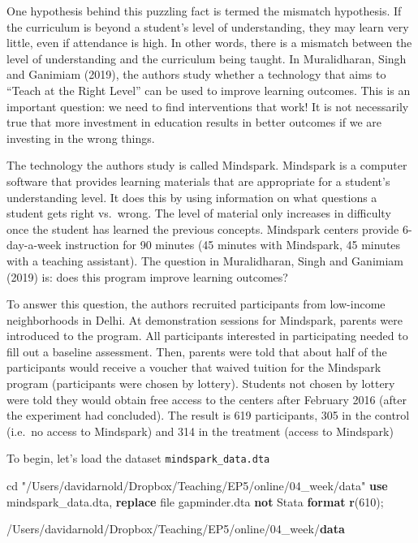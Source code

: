 \documentclass[
]{book}
\newenvironment{Shaded}{\begin{snugshade}}{\end{snugshade}}
\newcommand{\FunctionTok}[1]{\textcolor[rgb]{0.13,0.29,0.53}{\textbf{#1}}}
\newcommand{\KeywordTok}[1]{\textcolor[rgb]{0.13,0.29,0.53}{\textbf{#1}}}
\newcommand{\NormalTok}[1]{#1}
\newcommand{\StringTok}[1]{\textcolor[rgb]{0.31,0.60,0.02}{#1}}
\begin{document}
One hypothesis behind this puzzling fact is termed the mismatch hypothesis. If the curriculum is beyond a student's level of understanding, they may learn very little, even if attendance is high. In other words, there is a mismatch between the level of understanding and the curriculum being taught. In Muralidharan, Singh and Ganimiam (2019)\citep{msg2019disrupting}, the authors study whether a technology that aims to ``Teach at the Right Level'' can be used to improve learning outcomes. This is an important question: we need to find interventions that work! It is not necessarily true that more investment in education results in better outcomes if we are investing in the wrong things.

The technology the authors study is called Mindspark. Mindspark is a computer software that provides learning materials that are appropriate for a student's understanding level. It does this by using information on what questions a student gets right vs.~wrong. The level of material only increases in difficulty once the student has learned the previous concepts. Mindspark centers provide 6-day-a-week instruction for 90 minutes (45 minutes with Mindspark, 45 minutes with a teaching assistant). The question in Muralidharan, Singh and Ganimiam (2019) is: does this program improve learning outcomes?

To answer this question, the authors recruited participants from low-income neighborhoods in Delhi. At demonstration sessions for Mindspark, parents were introduced to the program. All participants interested in participating needed to fill out a baseline assessment. Then, parents were told that about half of the participants would receive a voucher that waived tuition for the Mindspark program (participants were chosen by lottery). Students not chosen by lottery were told they would obtain free access to the centers after February 2016 (after the experiment had concluded). The result is 619 participants, 305 in the control (i.e.~no access to Mindspark) and 314 in the treatment (access to Mindspark)

To begin, let's load the dataset \texttt{mindspark\_data.dta}

\begin{Shaded}
\begin{Highlighting}[]
\NormalTok{cd }\StringTok{"/Users/davidarnold/Dropbox/Teaching/EP5/online/04\_week/data"}
\KeywordTok{use}\NormalTok{ mindspark\_data.dta, }\KeywordTok{replace}
\NormalTok{file gapminder.dta }\KeywordTok{not}\NormalTok{ Stata }\KeywordTok{format}
\FunctionTok{r}\NormalTok{(610);}


\NormalTok{/Users/davidarnold/Dropbox/Teaching/EP5/online/04\_week/}\KeywordTok{data}
\end{Highlighting}
\end{Shaded}
\end{document}
